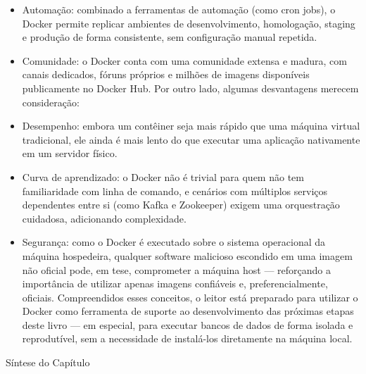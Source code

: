 \begin{itemize}
  \item Automação: combinado a ferramentas de automação (como cron jobs), o Docker permite replicar ambientes de desenvolvimento, homologação, staging e produção de forma consistente, sem configuração manual repetida.
\end{itemize}

\begin{itemize}
  \item Comunidade: o Docker conta com uma comunidade extensa e madura, com canais dedicados, fóruns próprios e milhões de imagens disponíveis publicamente no Docker Hub. Por outro lado, algumas desvantagens merecem consideração:
  \item Desempenho: embora um contêiner seja mais rápido que uma máquina virtual tradicional, ele ainda é mais lento do que executar uma aplicação nativamente em um servidor físico.
  \item Curva de aprendizado: o Docker não é trivial para quem não tem familiaridade com linha de comando, e cenários com múltiplos serviços dependentes entre si (como Kafka e Zookeeper) exigem uma orquestração cuidadosa, adicionando complexidade.
  \item Segurança: como o Docker é executado sobre o sistema operacional da máquina hospedeira, qualquer software malicioso escondido em uma imagem não oficial pode, em tese, comprometer a máquina host — reforçando a importância de utilizar apenas imagens confiáveis e, preferencialmente, oficiais. Compreendidos esses conceitos, o leitor está preparado para utilizar o Docker como ferramenta de suporte ao desenvolvimento das próximas etapas deste livro — em especial, para executar bancos de dados de forma isolada e reprodutível, sem a necessidade de instalá-los diretamente na máquina local.
\end{itemize}

Síntese do Capítulo

